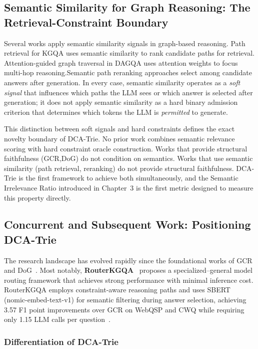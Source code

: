\subsection{Semantic Similarity for Graph Reasoning: The Retrieval-Constraint Boundary}

Several works apply semantic similarity signals in graph-based reasoning. Path retrieval for KGQA \citep{shi2021kgpath, saxena2022kgqa} uses semantic similarity to rank candidate paths for retrieval. Attention-guided graph traversal in DAGQA \citep{he2021multihop} uses attention weights to focus multi-hop reasoning.Semantic path reranking approaches select among candidate answers after generation. In every case, semantic similarity operates as a \textit{soft signal}  that influences which paths the LLM sees or which answer is selected after generation; it does not apply semantic similarity as a hard binary admission criterion that determines which tokens the LLM is
\textit{permitted} to generate.

This distinction between soft signals and hard constraints defines the exact novelty boundary of DCA-Trie. No prior work combines semantic relevance scoring with hard constraint oracle construction. Works that provide structural faithfulness (GCR,DoG) do not condition on semantics. Works that use semantic similarity (path retrieval, reranking) do
not provide structural faithfulness. DCA-Trie is the first framework to achieve both simultaneously, and the Semantic Irrelevance Ratio introduced in Chapter~3 is the first metric designed to measure this property directly.

\subsection{Concurrent and Subsequent Work: Positioning DCA-Trie}
\label{sec:concurrent_work}

The research landscape has evolved rapidly since the foundational works of GCR~\citep{luo2024gcr} and DoG~\citep{li2024dog}. Most notably, \textbf{RouterKGQA}~\citep{yuan2026routerkgqa} proposes a specialized--general model routing framework that achieves strong performance with minimal inference cost. RouterKGQA employs constraint-aware reasoning paths and uses SBERT (nomic-embed-text-v1) for semantic filtering during answer selection, achieving 3.57 F1 point improvements over GCR on WebQSP and CWQ while requiring only 1.15 LLM calls per question~\citep{yuan2026routerkgqa}.

\subsubsection{Differentiation of DCA-Trie}

